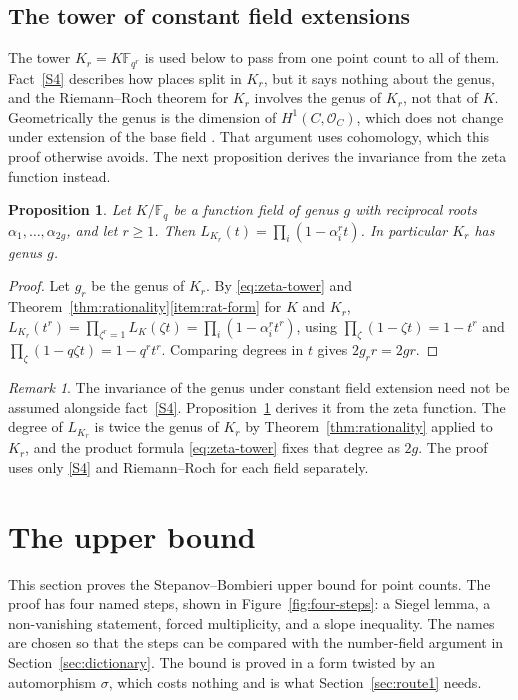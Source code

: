 \documentclass[11pt]{amsbook}
\theoremstyle{plain}
\newtheorem{proposition}[theorem]{Proposition}
\theoremstyle{definition}
\theoremstyle{remark}
\newtheorem{remark}[theorem]{Remark}
\numberwithin{equation}{section}
\numberwithin{figure}{chapter}
\numberwithin{table}{chapter}
\newcommand{\F}{\mathbb{F}}
\newcommand{\calO}{\mathcal{O}}
\begin{document}
\subsection{The tower of constant field extensions}

The tower $K_r=K\F_{q^r}$ is used below to pass from one point count
to all of them. Fact~\ref{S4} describes how places split in $K_r$,
but it says nothing about the genus, and the Riemann--Roch theorem
for $K_r$ involves the genus of $K_r$, not that of $K$.
Geometrically the genus is the dimension of $H^1(C,\calO_C)$, which
does not change under extension of the base field
\cite[Exercise~18.2.H]{Vakil2025}. That argument uses cohomology,
which this proof otherwise avoids. The next proposition derives the
invariance from the zeta function instead.

\begin{proposition}\label{prop:tower}
Let $K/\F_q$ be a function field of genus $g$ with reciprocal roots
$\alpha_1,\dots,\alpha_{2g}$, and let $r\ge1$. Then
$L_{K_r}(t)=\prod_i(1-\alpha_i^rt)$. In particular $K_r$ has genus
$g$.
\end{proposition}

\begin{proof}
Let $g_r$ be the genus of $K_r$. By \eqref{eq:zeta-tower} and
Theorem~\ref{thm:rationality}\eqref{item:rat-form} for $K$ and
$K_r$,
$L_{K_r}(t^r)=\prod_{\zeta^r=1}L_K(\zeta t)
=\prod_i(1-\alpha_i^rt^r)$,
using $\prod_\zeta(1-\zeta t)=1-t^r$ and
$\prod_\zeta(1-q\zeta t)=1-q^rt^r$. Comparing degrees in $t$ gives
$2g_rr=2gr$.
\end{proof}

\begin{remark}\label{rem:genus}
The invariance of the genus under constant field extension need not
be assumed alongside fact~\ref{S4}. Proposition~\ref{prop:tower}
derives it from the zeta function. The degree of $L_{K_r}$ is twice
the genus of $K_r$ by Theorem~\ref{thm:rationality} applied to
$K_r$, and the product formula \eqref{eq:zeta-tower} fixes that
degree as $2g$. The proof uses only \ref{S4} and Riemann--Roch for
each field separately.
\end{remark}

\section{The upper bound}
\label{sec:upper}

This section proves the Stepanov--Bombieri upper bound for point
counts. The proof has four named steps, shown in
Figure~\ref{fig:four-steps}: a Siegel lemma, a non-vanishing
statement, forced multiplicity, and a slope inequality. The names
are chosen so that the steps can be compared with the number-field
argument in Section~\ref{sec:dictionary}. The bound is proved in a
form twisted by an automorphism $\sigma$, which costs nothing and is
what Section~\ref{sec:route1} needs.
\end{document}
